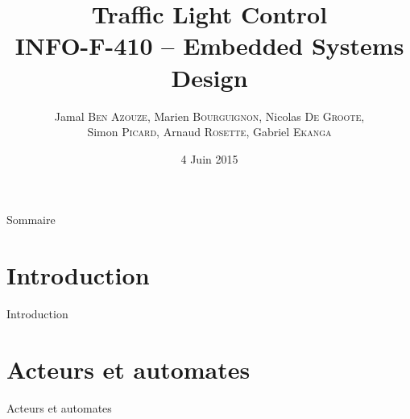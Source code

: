 \documentclass{bredelebeamer}
\begin{document}
\title[INFO-F-410 - Traffic Light Control]{\textbf{Traffic Light Control} \\INFO-F-410 -- Embedded Systems Design} %

\author[]{Jamal \textsc{Ben Azouze}, Marien \textsc{Bourguignon}, Nicolas \textsc{De Groote}, \\Simon \textsc{Picard}, Arnaud \textsc{Rosette}, Gabriel \textsc{Ekanga}}
\date{4 Juin 2015} %

\begin{frame}
\titlepage %
\end{frame}

\begin{frame}{Sommaire}
\tableofcontents %
\end{frame}

\section{Introduction}
\begin{frame}{Introduction}

\end{frame}

\section{Acteurs et automates}
\begin{frame}{Acteurs et automates}

\end{frame}
\end{document}

